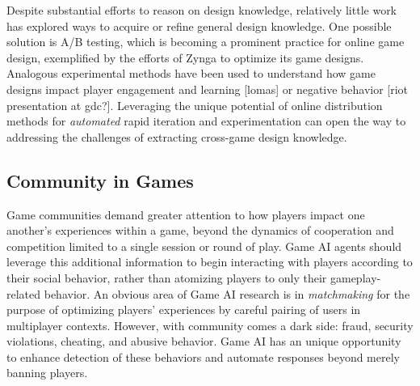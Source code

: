 \documentclass[conference]{IEEEtran}
\begin{document}
Despite substantial efforts to reason on design knowledge, relatively little work has explored ways to acquire or refine general design knowledge. 
One possible solution is A/B testing, which is becoming a prominent practice for online game design, exemplified by the efforts of Zynga to optimize its game designs. 
Analogous experimental methods have been used to understand how game designs impact player engagement and learning [lomas] or negative behavior [riot presentation at gdc?]. 
Leveraging the unique potential of online distribution methods for {\em automated} rapid iteration and experimentation can open the way to addressing the challenges of extracting cross-game design knowledge.



\subsection{Community in Games}

Game communities demand greater attention to how players impact one another's experiences within a game, beyond the dynamics of cooperation and competition limited to a single session or round of play. Game AI agents should leverage this additional information to begin interacting with players according to their social behavior, rather than atomizing players to only their gameplay-related behavior.
%
An obvious area of Game AI research is in {\em matchmaking} for the purpose of optimizing players' experiences by careful pairing of users in multiplayer contexts.
However, with community comes a dark side: fraud, security violations, cheating, and abusive behavior. 
Game AI has an unique opportunity to enhance detection of these behaviors and automate responses beyond merely banning players.
\end{document}
